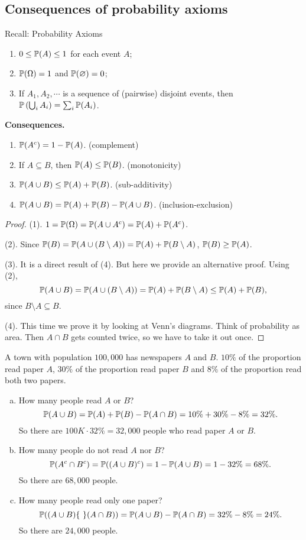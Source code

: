  \subsection{Consequences of probability axioms}
  \label{subsec:1.4}
  Recall: Probability Axioms
  \begin{enumerate}
  \item $0\le \mathbb{P}(A)\le 1$ for each event $A$;
  \item $\mathbb{P}(\Omega) = 1$ and $\mathbb{P}(\varnothing) =0$;
  \item If $A_1, A_2, \cdots$ is a sequence of (pairwise) disjoint events, then $  \mathbb{P}\left( \bigcup_i A_i \right) = \sum_i \mathbb{P}(A_i)$.
  \end{enumerate}
  \textbf{Consequences.}
  \begin{enumerate}[(1)]
  \item $\mathbb{P}(A^c) = 1- \mathbb{P}(A)$. (complement)
  \item If $A\subseteq B$, then $\mathbb{P}(A) \le \mathbb{P}(B)$. (monotonicity)
  \item $\mathbb{P}(A\cup B) \le \mathbb{P}(A) + \mathbb{P}(B)$. (sub-additivity)
  \item $\mathbb{P}(A\cup B) = \mathbb{P}(A) + \mathbb{P}(B) - \mathbb{P}(A\cup B)$. (inclusion-exclusion)
  \end{enumerate}
  \begin{proof}
    (1). $1 = \mathbb{P}(\Omega) = \mathbb{P}(A\cup A^c) = \mathbb{P}(A) + \mathbb{P}(A^c)$.

    (2). Since $\mathbb{P}(B) = \mathbb{P}(A\cup (B\setminus A)) = \mathbb{P}(A) + \mathbb{P}(B\setminus
    A)$, $\mathbb{P}(B) \ge \mathbb{P}(A)$.

    (3). It is a direct result of (4). But here we provide an alternative proof.
    Using (2),
    \[
      \mathbb{P}(A\cup B) = \mathbb{P}(A\cup (B\setminus A)) = \mathbb{P}(A) + \mathbb{P}(B\setminus A) \le
      \mathbb{P}(A) + \mathbb{P}(B),
    \]
    since $B\setminus A\subseteq B$. 

    (4). This time we prove it by looking at Venn's diagrams. Think of
    probability as area. Then $A \cap B$ gets counted twice, so we have to take
    it out once.
  \end{proof}
  \begin{example}
    A town with population $100,000$ has newspapers $A$ and $B$. $10\%$ of the
    proportion read paper $A$, $30\%$ of the
    proportion read paper $B$ and $8\%$ of the
    proportion read both two papers. 
  \end{example}
  \begin{enumerate}[(a)]
  \item How many people read $A$ or $B$?
    \[
      \mathbb{P}(A\cup B) = \mathbb{P}(A) + \mathbb{P}(B) - \mathbb{P}(A\cap B) = 10\% + 30\% - 8\% = 32\%.
    \]
    So there are $100 K\cdot 32\% = 32,000$ people who read paper $A$ or $B$.
  \item How many people do not read $A$ nor $B$?
    \[
      \mathbb{P}(A^c\cap B^c) = \mathbb{P}((A\cup B)^c) = 1 - \mathbb{P}(A\cup B) = 1-32\% = 68\%.
    \]
    So there are $68,000$ people.
  \item How many people read only one paper?
    \[
      \mathbb{P}((A\cup B)\lbrace\ \rbrace(A\cap B)) = \mathbb{P}(A\cup B) - \mathbb{P}(A\cap B) = 32\% -8\% = 24\%.
    \]
    So there are $24,000$ people.
  \end{enumerate}
